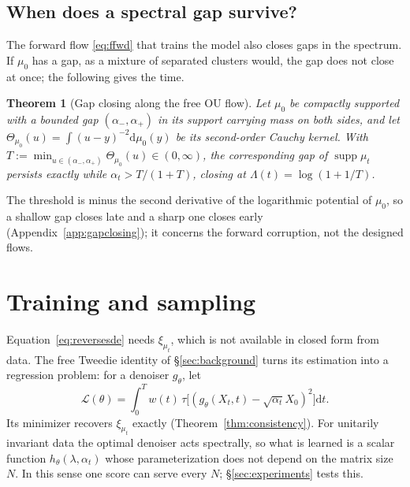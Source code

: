 \documentclass[11pt]{article}
\newcommand{\dd}{\mathrm{d}}
\DeclareMathOperator{\supp}{supp}
\theoremstyle{plain}
\newtheorem{theorem}{Theorem}[section]
\theoremstyle{definition}
\theoremstyle{remark}
\begin{document}
\subsection{When does a spectral gap survive?}\label{sec:gapclosing}

The forward flow \eqref{eq:ffwd} that trains the model also closes gaps in the spectrum. If
$\mu_0$ has a gap, as a mixture of separated clusters would, the gap does not close at once;
the following gives the time.

\begin{theorem}[Gap closing along the free OU flow]\label{thm:gapclosing}
Let $\mu_0$ be compactly supported with a bounded gap $(\alpha_-,\alpha_+)$ in its
support carrying mass on both sides, and let
$\Theta_{\mu_0}(u)=\int(u-y)^{-2}\dd\mu_0(y)$ be its second-order Cauchy kernel. With
$T:=\min_{u\in(\alpha_-,\alpha_+)}\Theta_{\mu_0}(u)\in(0,\infty)$, the corresponding
gap of $\supp\mu_t$ persists exactly while $\alpha_t > T/(1+T)$, closing at
$\Lambda(t)=\log(1+1/T)$.
\end{theorem}

The threshold is minus the second derivative of the logarithmic potential of $\mu_0$, so a shallow gap
closes late and a sharp one closes early (Appendix~\ref{app:gapclosing}); it concerns the forward
corruption, not the designed flows.

\section{Training and sampling}\label{sec:algorithm}

Equation~\eqref{eq:reversesde} needs $\xi_{\mu_t}$, which is not available in closed form
from data. The free Tweedie identity of \S\ref{sec:background} turns its estimation into a
regression problem: for a denoiser $g_\theta$, let
\begin{equation}\label{eq:loss}
  \mathcal L(\theta)=\int_0^T\!\! w(t)\,\tau\big[(g_\theta(X_t,t)-\sqrt{\alpha_t}X_0)^2
  \big]\dd t.
\end{equation}
Its minimizer recovers $\xi_{\mu_t}$ exactly (Theorem~\ref{thm:consistency}). For
unitarily invariant data the optimal denoiser acts spectrally, so what is learned is a scalar
function $h_\theta(\lambda,\alpha_t)$ whose parameterization does not depend on the matrix size
$N$. In this sense one score can serve every $N$; \S\ref{sec:experiments} tests this.
\end{document}
